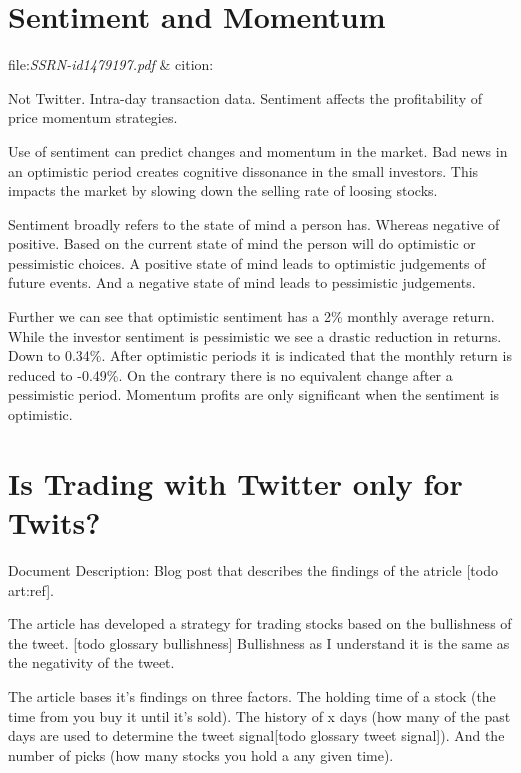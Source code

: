 \section{Sentiment and Momentum}\label{sentiment_and_momentum}
file:\textit{SSRN-id1479197.pdf} & cition:\cite[]{doukas10:sentiment_and_momentum}

Not Twitter. Intra-day transaction data. 
Sentiment affects the profitability of price momentum strategies.

Use of sentiment can predict changes and momentum in the market.
Bad news in an optimistic period creates cognitive dissonance in the small
investors. This impacts the market by slowing down the selling rate of loosing
stocks. \cite[p29]{doukas10:sentiment_and_momentum} 

Sentiment broadly refers to the state of mind a person has. Whereas negative of
positive. Based on the current state of mind the person will do optimistic or
pessimistic choices. A positive state of mind leads to optimistic judgements of
future events. And a negative state of mind leads to pessimistic judgements. 
\cite[p4]{doukas10:sentiment_and_momentum} 

Further we can see that optimistic sentiment has a 2\% monthly average return. 
While the investor sentiment is pessimistic we see a drastic reduction in
returns. Down to 0.34\%.\cite[p5]{doukas10:sentiment_and_momentum} 
After optimistic periods it is indicated that the monthly return is reduced to
-0.49\%. On the contrary there is no equivalent change after a pessimistic
period. \cite[p6-7]{doukas10:sentiment_and_momentum} 
Momentum profits are only significant when the sentiment is optimistic.
\cite[p29]{doukas10:sentiment_and_momentum}


\section{Is Trading with Twitter only for Twits?}\label{art:ITTT}
Document Description: Blog post that describes the findings of the atricle [todo
art:ref]. 

The article has developed a strategy for trading stocks based on the
bullishness of the tweet. [todo glossary bullishness] Bullishness as I
understand it
is the same as the negativity of the tweet. 

The article bases it's findings on three factors. The holding time of a stock
(the time from you buy it until it's sold). The history of x days (how many of
the past days are used to determine the tweet signal[todo glossary tweet
signal]). And the number of picks (how many stocks you hold a any given
time). 

